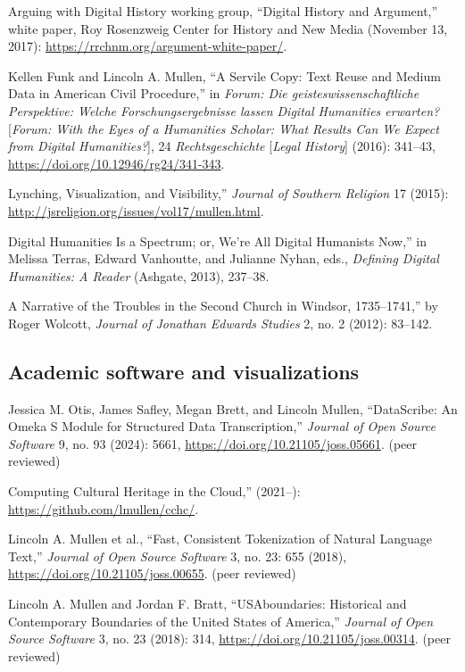 \documentclass[11pt]{article}
\begin{document}
Arguing with Digital History working group, ``Digital History and Argument,'' white paper, Roy Rosenzweig Center for History and New Media (November 13, 2017): \url{https://rrchnm.org/argument-white-paper/}.

Kellen Funk and Lincoln A. Mullen, ``A Servile Copy: Text Reuse and Medium Data in American Civil Procedure,'' in \emph{Forum: Die geisteswissenschaftliche Perspektive: Welche Forschungsergebnisse lassen Digital Humanities erwarten?} [\emph{Forum: With the Eyes of a Humanities Scholar: What Results Can We Expect from Digital Humanities?}], 24 \emph{Rechtsgeschichte} [\emph{Legal History}] (2016): 341--43, \url{https://doi.org/10.12946/rg24/341-343}.

\noindent{}Lynching, Visualization, and Visibility,'' \emph{Journal of Southern Religion} 17 (2015): \url{http://jsreligion.org/issues/vol17/mullen.html}.

\noindent{}Digital Humanities Is a Spectrum; or, We're All Digital Humanists Now,'' in Melissa Terras, Edward Vanhoutte, and Julianne Nyhan, eds., \emph{Defining Digital Humanities: A Reader} (Ashgate, 2013), 237--38.

\noindent{}A Narrative of the Troubles in the Second Church in Windsor, 1735--1741,'' by Roger Wolcott, \emph{Journal of Jonathan Edwards Studies} 2, no. 2 (2012): 83--142.

\subsection{Academic software and visualizations}\label{Academic software}

Jessica M. Otis, James Safley, Megan Brett, and Lincoln Mullen, ``DataScribe: An Omeka S Module for 
Structured Data Transcription,'' \emph{Journal of Open Source Software} 9, no. 93 
(2024): 5661, \url{https://doi.org/10.21105/joss.05661}. (peer reviewed)

\noindent{}Computing Cultural Heritage in the Cloud,'' (2021--): \url{https://github.com/lmullen/cchc/}.

Lincoln A. Mullen et al., ``Fast, Consistent Tokenization of Natural Language Text,'' \emph{Journal of Open Source Software} 3, no. 23: 655 (2018), \url{https://doi.org/10.21105/joss.00655}. (peer reviewed)

Lincoln A. Mullen and Jordan F. Bratt, ``USAboundaries: Historical and Contemporary Boundaries of the United States of America,'' \emph{Journal of Open Source Software} 3, no. 23 (2018): 314, \url{https://doi.org/10.21105/joss.00314}. (peer reviewed)
\end{document}
